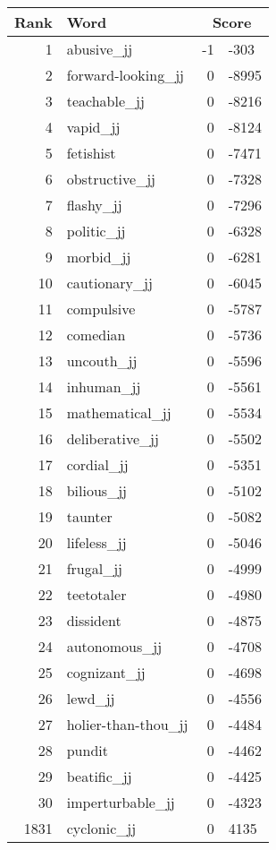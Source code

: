 \begin{longtable}[!htbp]{| rlr@{.}l |}
    \hline
    \textbf{Rank} & \textbf{Word} & \multicolumn{2}{c|}{\textbf{Score}} \\
    \hline
    \endhead
    1 & abusive\_jj & -1 & -303 \\
    2 & forward-looking\_jj & 0 & -8995 \\
    3 & teachable\_jj & 0 & -8216 \\
    4 & vapid\_jj & 0 & -8124 \\
    5 & fetishist & 0 & -7471 \\
    6 & obstructive\_jj & 0 & -7328 \\
    7 & flashy\_jj & 0 & -7296 \\
    8 & politic\_jj & 0 & -6328 \\
    9 & morbid\_jj & 0 & -6281 \\
    10 & cautionary\_jj & 0 & -6045 \\
    11 & compulsive & 0 & -5787 \\
    12 & comedian & 0 & -5736 \\
    13 & uncouth\_jj & 0 & -5596 \\
    14 & inhuman\_jj & 0 & -5561 \\
    15 & mathematical\_jj & 0 & -5534 \\
    16 & deliberative\_jj & 0 & -5502 \\
    17 & cordial\_jj & 0 & -5351 \\
    18 & bilious\_jj & 0 & -5102 \\
    19 & taunter & 0 & -5082 \\
    20 & lifeless\_jj & 0 & -5046 \\
    21 & frugal\_jj & 0 & -4999 \\
    22 & teetotaler & 0 & -4980 \\
    23 & dissident & 0 & -4875 \\
    24 & autonomous\_jj & 0 & -4708 \\
    25 & cognizant\_jj & 0 & -4698 \\
    26 & lewd\_jj & 0 & -4556 \\
    27 & holier-than-thou\_jj & 0 & -4484 \\
    28 & pundit & 0 & -4462 \\
    29 & beatific\_jj & 0 & -4425 \\
    30 & imperturbable\_jj & 0 & -4323 \\
    1831 & cyclonic\_jj & 0 & 4135 \\

\end{longtable}
